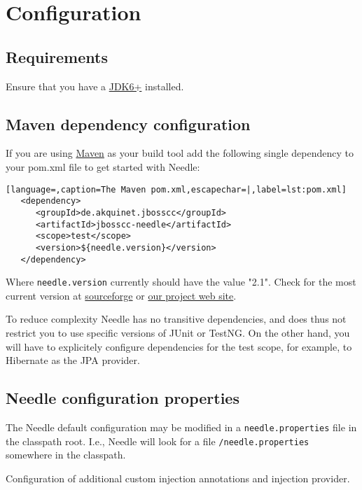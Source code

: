 \chapter{Configuration}

\section{Requirements}

Ensure that you have a 
\href{http://www.oracle.com/technetwork/java/javase/downloads/index.html}{JDK6+} installed.

\section{Maven dependency configuration}
If you are using \href{http://maven.apache.org/}{Maven} as your build tool add the following single dependency to your pom.xml file to get started with Needle:

\begin{lstlisting}[language=,caption=The Maven pom.xml,escapechar=|,label=lst:pom.xml]
   <dependency>
      <groupId>de.akquinet.jbosscc</groupId>
      <artifactId>jbosscc-needle</artifactId>
      <scope>test</scope>
      <version>${needle.version}</version>
   </dependency>
\end{lstlisting}

Where \verb|needle.version| currently should have the value "2.1". Check for the most current version at \href{http://sourceforge.net/projects/jbosscc-needle/}{sourceforge} or \href{http://needle.spree.de/}{our project web site}.

To reduce complexity Needle has no transitive dependencies, and does thus not restrict you to use specific versions of JUnit or TestNG.
On the other hand, you will have to explicitely configure dependencies for the test scope, for example, to Hibernate as the JPA provider.

\section{Needle configuration properties}

The Needle default configuration may be modified in a \verb|needle.properties| file in the classpath root. I.e., Needle will look for a file 
\verb|/needle.properties| somewhere in the classpath.

\parskip 14pt
\parindent 0pt
Configuration of additional custom injection annotations and injection provider.

